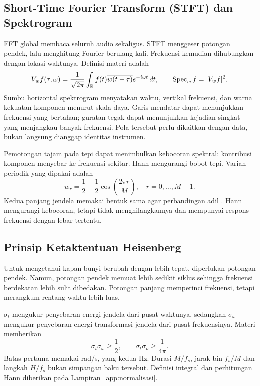 \subsection{Short-Time Fourier Transform (STFT) dan Spektrogram}
FFT global membaca seluruh audio sekaligus. STFT menggeser potongan
pendek, lalu menghitung Fourier berulang kali. Frekuensi kemudian
dihubungkan dengan lokasi waktunya. Definisi materi adalah
\cite{kuliah6}
\begin{equation}
 V_wf(\tau,\omega)=\frac1{\sqrt{2\pi}}
 \int_{\mathbb R}f(t)\overline{w(t-\tau)}e^{-i\omega t}\,dt,
 \qquad \operatorname{Spec}_wf=|V_wf|^2.
 \label{eq:stft}
\end{equation}
Sumbu horizontal spektrogram menyatakan waktu, vertikal frekuensi,
dan warna kekuatan komponen menurut skala daya. Garis mendatar dapat
menunjukkan frekuensi yang bertahan; guratan tegak dapat menunjukkan
kejadian singkat yang menjangkau banyak frekuensi. Pola tersebut
perlu dikaitkan dengan data, bukan langsung dianggap identitas instrumen.

Pemotongan tajam pada tepi dapat menimbulkan kebocoran spektral:
kontribusi komponen menyebar ke frekuensi sekitar. Hann mengurangi
bobot tepi. Varian periodik yang dipakai adalah
\begin{equation}
 w_r=\frac12-\frac12\cos\left(\frac{2\pi r}{M}\right),
 \quad r=0,\ldots,M-1.
 \label{eq:hann}
\end{equation}
Kedua panjang jendela memakai bentuk sama agar perbandingan adil
\cite{hann}. Hann mengurangi kebocoran, tetapi tidak menghilangkannya
dan mempunyai respons frekuensi dengan lebar tertentu.

\subsection{Prinsip Ketaktentuan Heisenberg}
Untuk mengetahui kapan bunyi berubah dengan lebih tepat, diperlukan
potongan pendek. Namun, potongan pendek memuat lebih sedikit siklus
sehingga frekuensi berdekatan lebih sulit dibedakan. Potongan panjang
memperinci frekuensi, tetapi merangkum rentang waktu lebih luas.

$\sigma_t$ mengukur penyebaran energi jendela dari pusat waktunya,
sedangkan $\sigma_\omega$ mengukur penyebaran energi transformasi
jendela dari pusat frekuensinya. Materi memberikan
\begin{equation}
 \sigma_t\sigma_\omega\geq\frac12,\qquad
 \sigma_t\sigma_\nu\geq\frac1{4\pi}.
 \label{eq:heisenberg}
\end{equation}
Batas pertama memakai rad/s, yang kedua Hz. Durasi $M/f_s$, jarak
bin $f_s/M$ dan langkah $H/f_s$ bukan simpangan baku tersebut.
Definisi integral dan perhitungan Hann diberikan pada
Lampiran~\ref{app:normalisasi}.

